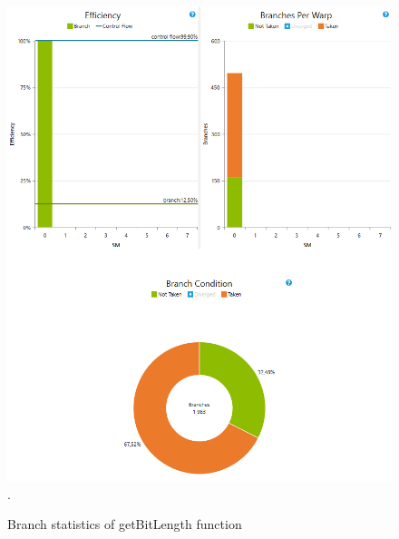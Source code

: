 \documentclass[oneside,openright,12pt,final,en]{mgr}
\begin{document}
\begin{figure}[H]
	\centering
	\includegraphics[width=\textwidth]{bitlength_branch}.
	\caption{Branch statistics of getBitLength function}
	\label{fig:bitlength_branch}
\end{figure}
\end{document}
